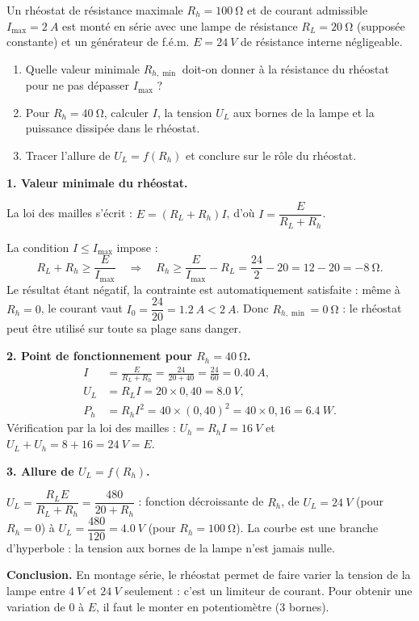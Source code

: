 \documentclass[11pt]{article}
\newcommand{\cle}[1]{{\popxbold\color{popdark}#1}}
\begin{document}
\begin{exoresolu}
Un rhéostat de résistance maximale $R_h = \SI{100}{\ohm}$ et de courant admissible $I_{\max} = \SI{2}{A}$ est monté en série avec une lampe de résistance $R_L = \SI{20}{\ohm}$ (supposée constante) et un générateur de f.é.m. $E = \SI{24}{V}$ de résistance interne négligeable.
\begin{enumerate}
\item Quelle valeur minimale $R_{h,\min}$ doit-on donner à la résistance du rhéostat pour ne pas dépasser $I_{\max}$ ?
\item Pour $R_h = \SI{40}{\ohm}$, calculer $I$, la tension $U_L$ aux bornes de la lampe et la puissance dissipée dans le rhéostat.
\item Tracer l'allure de $U_L = f(R_h)$ et conclure sur le rôle du rhéostat.
\end{enumerate}
\tcblower
\textbf{1. Valeur minimale du rhéostat.}

La loi des mailles s'écrit : $E = (R_L + R_h) I$, d'où $I = \dfrac{E}{R_L + R_h}$.

La condition $I \leq I_{\max}$ impose :
\[
R_L + R_h \geq \frac{E}{I_{\max}} \quad\Longrightarrow\quad R_h \geq \frac{E}{I_{\max}} - R_L = \frac{24}{2} - 20 = 12 - 20 = \SI{-8}{\ohm}.
\]
Le résultat étant négatif, la contrainte est automatiquement satisfaite : même à $R_h = 0$, le courant vaut $I_0 = \dfrac{24}{20} = \SI{1,2}{A} < \SI{2}{A}$. Donc $R_{h,\min} = \SI{0}{\ohm}$ : le rhéostat peut être utilisé sur toute sa plage sans danger.

\textbf{2. Point de fonctionnement pour $R_h = \SI{40}{\ohm}$.}
\begin{align*}
I &= \frac{E}{R_L + R_h} = \frac{24}{20 + 40} = \frac{24}{60} = \SI{0,40}{A},\\
U_L &= R_L I = 20 \times 0{,}40 = \SI{8,0}{V},\\
P_h &= R_h I^2 = 40 \times (0{,}40)^2 = 40 \times 0{,}16 = \SI{6,4}{W}.
\end{align*}
Vérification par la loi des mailles : $U_h = R_h I = \SI{16}{V}$ et $U_L + U_h = 8 + 16 = \SI{24}{V} = E$. \checkmark

\textbf{3. Allure de $U_L = f(R_h)$.}

$U_L = \dfrac{R_L E}{R_L + R_h} = \dfrac{480}{20 + R_h}$ : fonction décroissante de $R_h$, de $U_L = \SI{24}{V}$ (pour $R_h = 0$) à $U_L = \dfrac{480}{120} = \SI{4,0}{V}$ (pour $R_h = \SI{100}{\ohm}$). La courbe est une branche d'hyperbole : la tension aux bornes de la lampe n'est jamais nulle.

\textbf{Conclusion.} En montage série, le rhéostat permet de faire varier la tension de la lampe entre $\SI{4}{V}$ et $\SI{24}{V}$ seulement : c'est un \cle{limiteur de courant}. Pour obtenir une variation de $0$ à $E$, il faut le monter en \cle{potentiomètre} (3 bornes).
\end{exoresolu}
\end{document}
